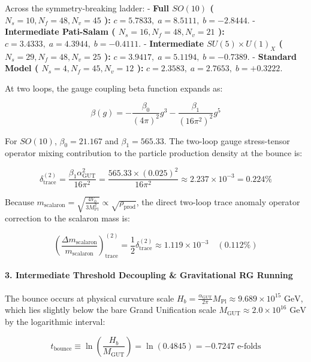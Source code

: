 \documentclass[11pt,a4paper]{article}
\theoremstyle{definition}\newtheorem{definition}{Definition}
\theoremstyle{remark}\newtheorem{remark}{Remark}
\begin{document}
Across the symmetry-breaking ladder:
- \textbf{Full $SO(10)$ ( $N_s=10, N_f=48, N_v=45$ ):} $c = 5.7833, \; a = 8.5111, \; b = -2.8444$.
- \textbf{Intermediate Pati-Salam ( $N_s=16, N_f=48, N_v=21$ ):} $c = 3.4333, \; a = 4.3944, \; b = -0.4111$.
- \textbf{Intermediate $SU(5) \times U(1)_X$ ( $N_s=29, N_f=48, N_v=25$ ):} $c = 3.9417, \; a = 5.1194, \; b = -0.7389$.
- \textbf{Standard Model ( $N_s=4, N_f=45, N_v=12$ ):} $c = 2.3583, \; a = 2.7653, \; b = +0.3222$.

At two loops, the gauge coupling beta function expands as:


\begin{equation}
\beta(g) = - \frac{\beta_0}{(4\pi)^2} g^3 - \frac{\beta_1}{(16\pi^2)^2} g^5
\end{equation}


For $SO(10)$, $\beta_0 = 21.167$ and $\beta_1 = 565.33$. The two-loop gauge stress-tensor operator mixing contribution to the particle production density at the bounce is:


\begin{equation}
\delta_{\text{trace}}^{(2)} = \frac{\beta_1 \alpha_{\text{GUT}}^2}{16\pi^2} = \frac{565.33 \times (0.025)^2}{16\pi^2} \approx 2.237 \times 10^{-3} = 0.224\%
\end{equation}


Because $m_{\text{scalaron}} = \sqrt{\frac{4 V_0}{3 M_{\text{Pl}}^2}} \propto \sqrt{\rho_{\text{prod}}}$, the direct two-loop trace anomaly operator correction to the scalaron mass is:


\begin{equation}
\left(\frac{\Delta m_{\text{scalaron}}}{m_{\text{scalaron}}}\right)_{\text{trace}}^{(2)} = \frac{1}{2} \delta_{\text{trace}}^{(2)} \approx 1.119 \times 10^{-3} \quad (\mathbf{0.112\%})
\end{equation}

\paragraph{3. Intermediate Threshold Decoupling \& Gravitational RG Running}

The bounce occurs at physical curvature scale $H_b = \frac{\alpha_{\text{GUT}}}{2\pi} M_{\text{Pl}} \approx 9.689 \times 10^{15}\text{ GeV}$, which lies slightly below the bare Grand Unification scale $M_{\text{GUT}} \approx 2.0 \times 10^{16}\text{ GeV}$ by the logarithmic interval:


\begin{equation}
t_{\text{bounce}} \equiv \ln\left(\frac{H_b}{M_{\text{GUT}}}\right) = \ln(0.4845) = -0.7247 \text{ e-folds}
\end{equation}
\end{document}
